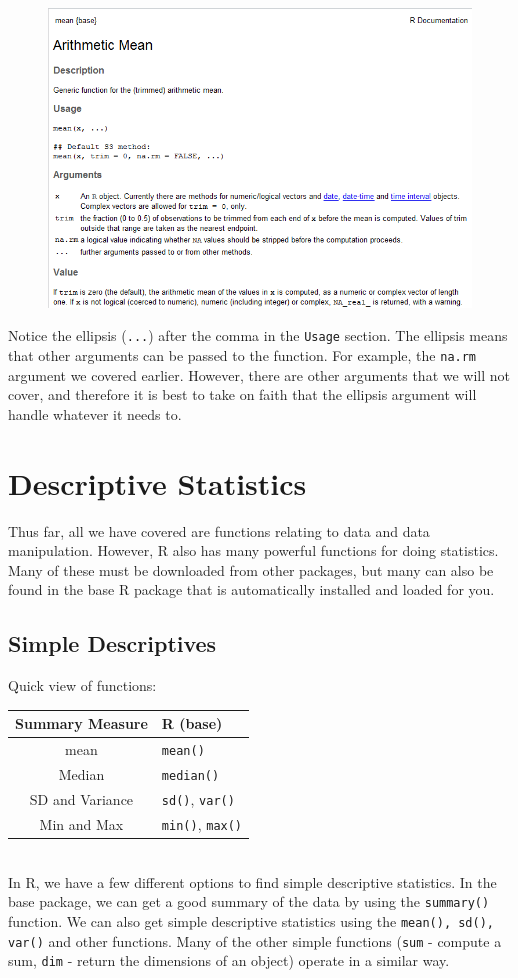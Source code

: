 \documentclass[11pt,letterpaper,fleqn]{report}
\begin{document}
\begin{figure}[h!]
\centering
\includegraphics[width = 5in]{mean_help.png}
\end{figure}
\FloatBarrier
Notice the ellipsis (\texttt{...}) after the comma in the \texttt{Usage} section. The ellipsis means that other arguments can be passed to the function. For example, the \texttt{na.rm} argument we covered earlier. However, there are other arguments that we will not cover, and therefore it is best to take on faith that the ellipsis argument will handle whatever it needs to.

\chapter{Descriptive Statistics}
Thus far, all we have covered are functions relating to data and data manipulation. However, R also has many powerful functions for doing statistics. Many of these must be downloaded from other packages, but many can also be found in the base R package that is automatically installed and loaded for you.

\section{Simple Descriptives}
Quick view of functions:
\begin{tabular}{c|l}
Summary Measure & R (base) \\
\hline
mean & \texttt{mean()}\\
Median & \texttt{median()}\\
SD and Variance & \texttt{sd()}, \texttt{var()}\\
Min and Max & \texttt{min()}, \texttt{max()}
\end{tabular}
\\
In R, we have a few different options to find simple descriptive statistics. In the base package, we can get a good summary of the data by using the \texttt{summary()} function. We can also get simple descriptive statistics using the \texttt{mean(), sd(), var()} and other functions. Many of the other simple functions (\texttt{sum} - compute a sum, \texttt{dim} - return the dimensions of an object) operate in a similar way.
\end{document}
